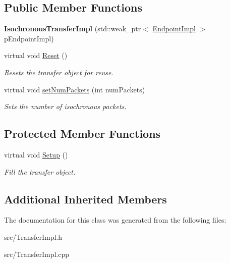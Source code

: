 \subsection*{Public Member Functions}
\begin{DoxyCompactItemize}
\item 
\hypertarget{class_lib_u_s_b_1_1_isochronous_transfer_impl_a5a04d2e87d6ea2c6aea3435ecb9a1f38}{{\bfseries Isochronous\-Transfer\-Impl} (std\-::weak\-\_\-ptr$<$ \hyperlink{class_lib_u_s_b_1_1_endpoint_impl}{Endpoint\-Impl} $>$ p\-Endpoint\-Impl)}\label{class_lib_u_s_b_1_1_isochronous_transfer_impl_a5a04d2e87d6ea2c6aea3435ecb9a1f38}

\item 
\hypertarget{class_lib_u_s_b_1_1_isochronous_transfer_impl_adcc8b1cd1d3587d2343b6dc263a02eed}{virtual void \hyperlink{class_lib_u_s_b_1_1_isochronous_transfer_impl_adcc8b1cd1d3587d2343b6dc263a02eed}{Reset} ()}\label{class_lib_u_s_b_1_1_isochronous_transfer_impl_adcc8b1cd1d3587d2343b6dc263a02eed}

\begin{DoxyCompactList}\small\item\em Resets the transfer object for reuse. \end{DoxyCompactList}\item 
\hypertarget{class_lib_u_s_b_1_1_isochronous_transfer_impl_a4804878f8f4adc34fc3f1e9fe308ae5d}{virtual void \hyperlink{class_lib_u_s_b_1_1_isochronous_transfer_impl_a4804878f8f4adc34fc3f1e9fe308ae5d}{set\-Num\-Packets} (int num\-Packets)}\label{class_lib_u_s_b_1_1_isochronous_transfer_impl_a4804878f8f4adc34fc3f1e9fe308ae5d}

\begin{DoxyCompactList}\small\item\em Sets the number of isochronous packets. \end{DoxyCompactList}\end{DoxyCompactItemize}
\subsection*{Protected Member Functions}
\begin{DoxyCompactItemize}
\item 
\hypertarget{class_lib_u_s_b_1_1_isochronous_transfer_impl_a08de576bdcc636f26a8c90735f1d46b9}{virtual void \hyperlink{class_lib_u_s_b_1_1_isochronous_transfer_impl_a08de576bdcc636f26a8c90735f1d46b9}{Setup} ()}\label{class_lib_u_s_b_1_1_isochronous_transfer_impl_a08de576bdcc636f26a8c90735f1d46b9}

\begin{DoxyCompactList}\small\item\em Fill the transfer object. \end{DoxyCompactList}\end{DoxyCompactItemize}
\subsection*{Additional Inherited Members}


The documentation for this class was generated from the following files\-:\begin{DoxyCompactItemize}
\item 
src/Transfer\-Impl.\-h\item 
src/Transfer\-Impl.\-cpp\end{DoxyCompactItemize}

